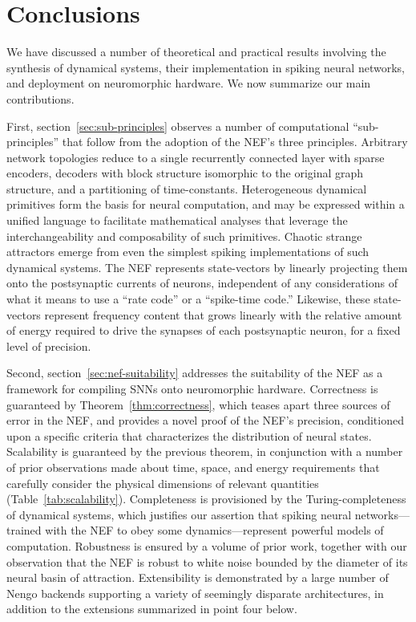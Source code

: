 \chapter{Conclusions}
\label{chapt:conclusions}

We have discussed a number of theoretical and practical results involving the synthesis of dynamical systems, their implementation in spiking neural networks, and deployment on neuromorphic hardware.
We now summarize our main contributions.

First, section~\ref{sec:sub-principles} observes a number of computational ``sub-principles'' that follow from the adoption of the NEF's three principles.
Arbitrary network topologies reduce to a single recurrently connected layer with sparse encoders, decoders with block structure isomorphic to the original graph structure, and a partitioning of time-constants.
Heterogeneous dynamical primitives form the basis for neural computation, and may be expressed within a unified language to facilitate mathematical analyses that leverage the interchangeability and composability of such primitives.
Chaotic strange attractors emerge from even the simplest spiking implementations of such dynamical systems.
The NEF represents state-vectors by linearly projecting them onto the postsynaptic currents of neurons,  independent of any considerations of what it means to use a ``rate code'' or a ``spike-time code.''
Likewise, these state-vectors represent frequency content that grows linearly with the relative amount of energy required to drive the synapses of each postsynaptic neuron, for a fixed level of precision.

Second, section~\ref{sec:nef-suitability} addresses the suitability of the NEF as a framework for compiling SNNs onto neuromorphic hardware.
Correctness is guaranteed by Theorem~\ref{thm:correctness}, which teases apart three sources of error in the NEF, and provides a novel proof of the NEF's precision, conditioned upon a specific criteria that characterizes the distribution of neural states.
Scalability is guaranteed by the previous theorem, in conjunction with a number of prior observations made about time, space, and energy requirements that carefully consider the physical dimensions of relevant quantities (Table~\ref{tab:scalability}).
Completeness is provisioned by the Turing-completeness of dynamical systems, which justifies our assertion that spiking neural networks---trained with the NEF to obey some dynamics---represent powerful models of computation.
Robustness is ensured by a volume of prior work, together with our observation that the NEF is robust to white noise bounded by the diameter of its neural basin of attraction.
Extensibility is demonstrated by a large number of Nengo backends supporting a variety of seemingly disparate architectures, in addition to the extensions summarized in point four below.

